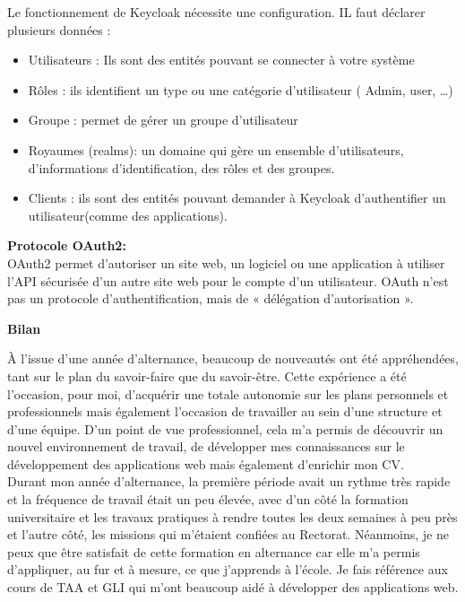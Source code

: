 \documentclass[12pt]{article}
\begin{document}
Le fonctionnement de Keycloak nécessite une configuration. IL faut déclarer plusieurs données : 
\begin{itemize}
\item Utilisateurs : Ils sont des entités pouvant se connecter à votre système
\item Rôles : ils identifient un type ou une catégorie d’utilisateur ( Admin, user, …)
\item Groupe : permet de gérer un groupe d’utilisateur
\item Royaumes (realms): un domaine qui gère un ensemble d’utilisateurs, d’informations d’identification, des rôles et des groupes.
\item Clients : ils sont des entités pouvant demander à Keycloak d’authentifier un utilisateur(comme des applications).
\end{itemize}
 
\textbf{Protocole OAuth2:}\\ 

OAuth2 permet d'autoriser un site web, un logiciel ou une application à utiliser l'API sécurisée d'un autre site web pour le compte d'un utilisateur. OAuth n'est pas un protocole d'authentification, mais de « délégation d'autorisation ».
\newpage

\begin{center}
\bfseries {Bilan}
\end{center}

À l'issue d'une année d'alternance, beaucoup de nouveautés ont été appréhendées, tant sur le plan du savoir-faire que du savoir-être. Cette expérience a été l'occasion, pour moi, d'acquérir une totale autonomie sur les plans personnels et professionnels mais également l'occasion de travailler au sein d'une structure et d'une équipe. D'un point de vue professionnel, cela m'a permis de découvrir un nouvel environnement de travail, de développer mes connaissances sur le développement des applications web mais également d'enrichir mon CV. \\


Durant mon année d'alternance, la première période avait un rythme très rapide et la fréquence de travail était un peu élevée, avec d'un côté la formation universitaire et les travaux pratiques à rendre toutes les deux semaines à peu près et l'autre côté, les missions qui m'étaient confiées au Rectorat. Néanmoins, je ne peux que être satisfait de cette formation en alternance car elle m'a permis d'appliquer, au fur et à mesure, ce que j’apprends à l'école. Je fais référence aux cours de TAA et GLI qui m'ont beaucoup aidé à développer des applications web. \\
\end{document}
